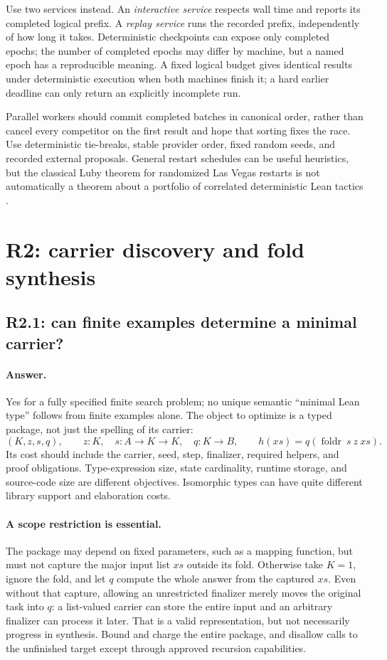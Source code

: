 \documentclass[11pt,a4paper]{article}
\newcommand{\foldr}{\operatorname{foldr}}
\newcommand{\answer}{\paragraph{Answer.}}
\theoremstyle{definition}
\theoremstyle{remark}
\begin{document}
Use two services instead. An \emph{interactive service} respects wall time and
reports its completed logical prefix. A \emph{replay service} runs the recorded
prefix, independently of how long it takes. Deterministic checkpoints can expose
only completed epochs; the number of completed epochs may differ by machine,
but a named epoch has a reproducible meaning. A fixed logical budget gives
identical results under deterministic execution when both machines finish it;
a hard earlier deadline can only return an explicitly incomplete run.

Parallel workers should commit completed batches in canonical order, rather
than cancel every competitor on the first result and hope that sorting fixes
the race. Use deterministic tie-breaks, stable provider order, fixed random
seeds, and recorded external proposals. General restart schedules can be useful
heuristics, but the classical Luby theorem for randomized Las Vegas restarts
is not automatically a theorem about a portfolio of correlated deterministic
Lean tactics \cite{luby}.

\section{R2: carrier discovery and fold synthesis}
\label{sec:r2}

\subsection{R2.1: can finite examples determine a minimal carrier?}
\answer Yes for a fully specified finite search problem; no unique semantic
``minimal Lean type'' follows from finite examples alone. The object to optimize
is a typed package, not just the spelling of its carrier:
\begin{equation}\label{eq:foldpackage}
 (K,z,s,q),\qquad z:K,\quad s:A\to K\to K,\quad q:K\to B,
 \qquad h(xs)=q(\foldr\ s\ z\ xs).
\end{equation}
Its cost should include the carrier, seed, step, finalizer, required helpers,
and proof obligations. Type-expression size, state cardinality, runtime storage,
and source-code size are different objectives. Isomorphic types can have quite
different library support and elaboration costs.

\paragraph{A scope restriction is essential.}
The package may depend on fixed parameters, such as a mapping function, but must
not capture the major input list $xs$ outside its fold. Otherwise take $K=1$,
ignore the fold, and let $q$ compute the whole answer from the captured $xs$.
Even without that capture, allowing an unrestricted finalizer merely moves the
original task into $q$: a list-valued carrier can store the entire input and an
arbitrary finalizer can process it later. That is a valid representation, but
not necessarily progress in synthesis. Bound and charge the entire package,
and disallow calls to the unfinished target except through approved recursion
capabilities.
\end{document}
